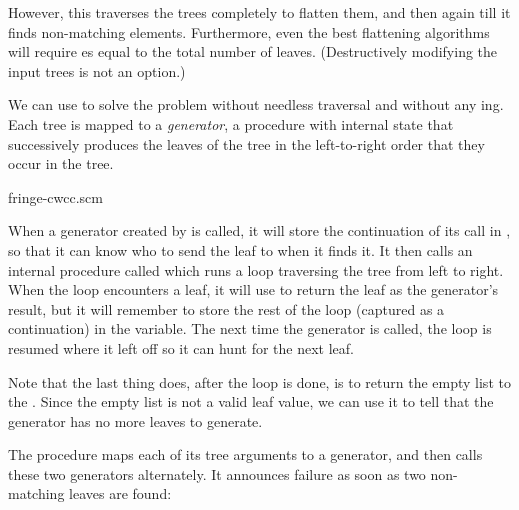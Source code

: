 \n
However, this traverses the trees completely to flatten
them, and then again till it finds non-matching
elements.  Furthermore, even the best flattening
algorithms will require es equal to the total
number of leaves.  (Destructively modifying the input
trees is not an option.)

We can use  to solve the problem without
needless traversal and without any ing.  Each
tree is mapped to a {\em generator}, a procedure with
internal state that successively produces the leaves of
the tree in the left-to-right order that they occur in
the tree.

\scmfilename fringe-cwcc.scm


\n
When a generator created by  is
called, it will store the continuation of its call in
, so that it can know who to send the leaf to
when it finds it.  It then calls an internal procedure
called  which runs a loop traversing
the tree from left to right.  When the loop encounters
a leaf, it will use  to return the leaf as
the generator's result, but it will remember to store
the rest of the loop (captured as a 
continuation) in the  variable.  The
next time the generator is called, the loop is resumed
where it left off so it can hunt for the next leaf.

Note that the last thing  does,
after the loop is done, is to return the empty list to
the
.  Since the empty list is not a valid leaf
value, we can use it to tell that the generator has
no more leaves to generate.

The procedure  maps each of its tree
arguments to a generator, and then calls these two
generators alternately.  It announces failure as soon
as two non-matching leaves are found:

